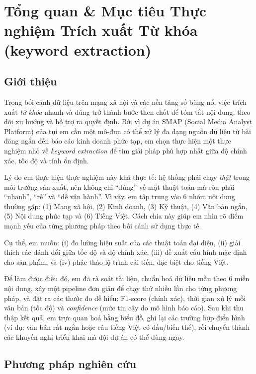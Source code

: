 \section{Tổng quan \& Mục tiêu Thực nghiệm Trích xuất Từ khóa (keyword extraction)}

\subsection{Giới thiệu}
Trong bối cảnh dữ liệu trên mạng xã hội và các nền tảng số bùng nổ, việc trích xuất \emph{từ khóa} nhanh và đúng trở thành bước then chốt để tóm tắt nội dung, theo dõi xu hướng và hỗ trợ ra quyết định. Bởi vì dự án SMAP (Social Media Analyst Platform) của tụi em cần một mô-đun có thể xử lý đa dạng nguồn dữ liệu từ bài đăng ngắn đến báo cáo kinh doanh phức tạp, em chọn thực hiện một thực nghiệm nhỏ về \textit{keyword extraction} để tìm giải pháp phù hợp nhất giữa độ chính xác, tốc độ và tính ổn định.

Lý do em thực hiện thực nghiệm này khá thực tế: hệ thống phải chạy \emph{thật} trong môi trường sản xuất, nên không chỉ “đúng” về mặt thuật toán mà còn phải “nhanh”, “rẻ” và “dễ vận hành”. Vì vậy, em tập trung vào 6 nhóm nội dung thường gặp: (1) Mạng xã hội, (2) Kinh doanh, (3) Kỹ thuật, (4) Văn bản ngắn, (5) Nội dung phức tạp và (6) Tiếng Việt. Cách chia này giúp em nhìn rõ điểm mạnh yếu của từng phương pháp theo bối cảnh sử dụng thực tế.

Cụ thể, em muốn: (i) đo lường hiệu suất của các thuật toán đại diện, (ii) giải thích các đánh đổi giữa tốc độ và độ chính xác, (iii) đề xuất cấu hình mặc định cho sản phẩm, và (iv) phác thảo lộ trình cải tiến, đặc biệt cho tiếng Việt.

Để làm được điều đó, em đã rà soát tài liệu, chuẩn hoá dữ liệu mẫu theo 6 miền nội dung, xây một pipeline đơn giản để chạy thử nhiều lần cho từng phương pháp, và đặt ra các thước đo dễ hiểu: F1-score (chính xác), thời gian xử lý mỗi văn bản (tốc độ) và \textit{confidence} (mức tin cậy do mô hình báo cáo). Sau khi thu thập kết quả, em trực quan hoá bằng biểu đồ, ghi lại các trường hợp điển hình (ví dụ: văn bản rất ngắn hoặc câu tiếng Việt có dấu/biến thể), rồi chuyển thành các khuyến nghị triển khai mà đội dự án có thể dùng ngay.

\subsection{Phương pháp nghiên cứu}

